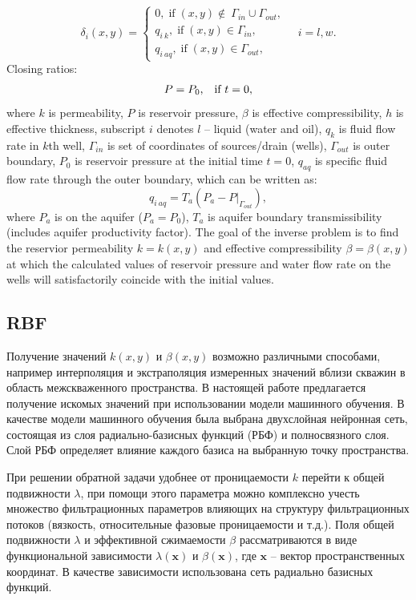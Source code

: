 \documentclass{article}
\begin{document}
\begin{equation} \label{bc}
	\delta_{i}(x,y)  = \left\{\begin{array}{crl}
		0, \;\mbox{if}\;(x,y) \notin\ \Gamma_{in}\cup\Gamma_{out},\\
		q_{i\:k}, \;\mbox{if}\;(x,y) \in \Gamma_{in},\\
		q_{i\:aq}, \;\mbox{if}\;(x,y) \in \Gamma_{out},
	\end{array}\right. \quad i = l,w.
\end{equation}
Closing ratios:
\begin{equation} \label{kr}
P = P_0\mbox{,\quad \mbox{if} $t=0$},
\end{equation}
where $k$ is permeability, $P$ is reservoir pressure, $\beta$ is
effective compressibility, $h$ is effective thickness, subscript $i$ denotes $l$ -- liquid
(water and oil), $q_k$ is fluid flow rate in $k$th well, $\Gamma_{in}$
is set of coordinates of sources/drain (wells), $\Gamma_{out}$ is
outer boundary, $P_0$ is reservoir pressure at the initial time $t=0$, $q_{aq}$ is specific fluid flow rate through the outer boundary, which can be written as:
\begin{equation*} \label{qaq}
	q_{i\:aq} = T_a(P_{a} - P|_{\Gamma_{out}}),
\end{equation*}
where $P_a$ is on the aquifer ($P_a = P_0$), $T_a$ is
aquifer boundary transmissibility (includes aquifer productivity factor). The goal of the inverse problem is to find the reservior permeability $k = k(x,y)$ and effective compressibility $\beta = \beta(x,y)$ at which the calculated values of reservoir pressure and water flow rate on the wells will satisfactorily coincide with the initial values.

\subsection{RBF}

Получение значений $k(x,y)$ и $\beta(x,y)$ возможно различными способами, например интерполяция и экстраполяция измеренных значений вблизи скважин в область межскваженного пространства. В настоящей работе предлагается получение искомых значений при использовании модели машинного обучения. В качестве модели машинного обучения была выбрана двухслойная нейронная сеть, состоящая из слоя радиально-базисных функций (РБФ) и полносвязного слоя. Слой РБФ определяет влияние каждого базиса на выбранную точку пространства.

При решении обратной задачи удобнее от проницаемости $k$ перейти к общей подвижности $\lambda$, при помощи этого параметра можно комплексно учесть множество фильтрационных параметров влияющих на структуру фильтрационных потоков (вязкость, относительные фазовые проницаемости и т.д.). 
Поля общей подвижности $\lambda$ и эффективной сжимаемости $\beta$ рассматриваются в виде функциональной зависимости $\lambda(\mathbf{x})$ и $\beta(\mathbf{x})$, где  $\mathbf{x}$ – вектор пространственных координат. В качестве зависимости использована сеть радиально базисных функций.
\end{document}
